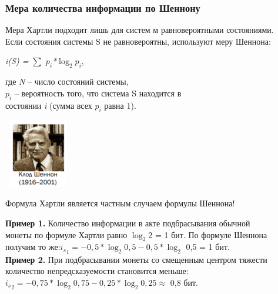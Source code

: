 \documentclass[10pt]{beamer}
\begin{document}
	\begin{frame}
	\begin{minipage}[b]{0.70\textwidth}
		\frametitle {{\color{blue}М}ера количества информации по Шеннону}
		\small Мера Хартли подходит лишь для систем м равновероятными состояниями. \\
		Если состояния системы S не равновероятны, используют меру Шеннона:
	\begin{center}
		\textit{i(S) = $\sum$ $p_i$*$\log_2$$p_i$},
	\end{center}
		\normalsize где \textit{N} -- число состояний системы,\\
		\textit{$p_i$} -- вероятность того, что система S находится в\\
		\quad состоянии \textit{i} (сумма всех \textit{$p_i$} равна 1).
	\end{minipage}
	\begin{minipage}[b]{0.20\textwidth}
		\includegraphics[width=3cm,height=3cm]{present_2.png}\\
	\end{minipage}
	\begin{center}
		{\color{green}Формула Хартли является частным случаем формулы Шеннона!}
	\end{center}

		\small \textbf{Пример 1.} Количество информации в акте подбрасывания обычной\\
		 монеты по формуле Хартли равно $\log_2$2 = 1 бит. По формуле Шеннона\\
		получим то же:${i_s}_1 = -0,5*\log_2 0,5 - 0,5*\log_2$ 0,5 = 1 бит.\\
		\textbf{Пример 2.} При подбрасывании монеты со смещенным центром тяжести\\
		 количество непредсказуемости становится меньше:${i_s}_2 = -0,75*\log_2 0,75 - 0,25*\log_2 0,25 \approx$ 0,8 бит.
		
	\end{frame}
\end{document}
